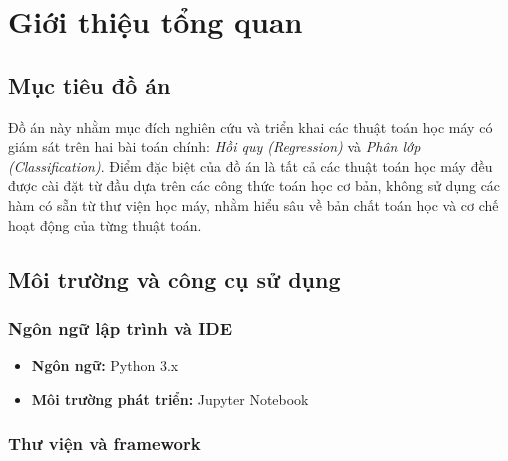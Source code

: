 \section{Giới thiệu tổng quan}

\subsection{Mục tiêu đồ án}

Đồ án này nhằm mục đích nghiên cứu và triển khai các thuật toán học máy có giám sát trên hai bài toán chính: \textit{Hồi quy (Regression)} và \textit{Phân lớp (Classification)}. Điểm đặc biệt của đồ án là tất cả các thuật toán học máy đều được cài đặt từ đầu dựa trên các công thức toán học cơ bản, không sử dụng các hàm có sẵn từ thư viện học máy, nhằm hiểu sâu về bản chất toán học và cơ chế hoạt động của từng thuật toán.

\subsection{Môi trường và công cụ sử dụng}

\subsubsection{Ngôn ngữ lập trình và IDE}
\begin{itemize}
    \item \textbf{Ngôn ngữ:} Python 3.x
    \item \textbf{Môi trường phát triển:} Jupyter Notebook
\end{itemize}

\subsubsection{Thư viện và framework}

